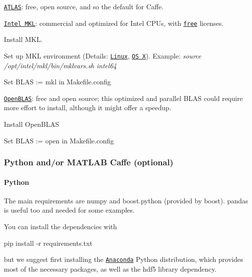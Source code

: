 \begin{DoxyItemize}
\item \href{http://math-atlas.sourceforge.net/}{\tt A\+T\+L\+AS}\+: free, open source, and so the default for Caffe.
\item \href{http://software.intel.com/en-us/intel-mkl}{\tt Intel M\+KL}\+: commercial and optimized for Intel C\+P\+Us, with \href{https://registrationcenter.intel.com/en/forms/?productid=2558}{\tt free} licenses.
\begin{DoxyEnumerate}
\item Install M\+KL.
\item Set up M\+KL environment (Details\+: \href{https://software.intel.com/en-us/node/528499}{\tt Linux}, \href{https://software.intel.com/en-us/node/528659}{\tt OS X}). Example\+: {\itshape source /opt/intel/mkl/bin/mklvars.sh intel64}
\item Set {\ttfamily B\+L\+AS \+:= mkl} in {\ttfamily Makefile.\+config}
\end{DoxyEnumerate}
\item \href{http://www.openblas.net/}{\tt Open\+B\+L\+AS}\+: free and open source; this optimized and parallel B\+L\+AS could require more effort to install, although it might offer a speedup.
\begin{DoxyEnumerate}
\item Install Open\+B\+L\+AS
\item Set {\ttfamily B\+L\+AS \+:= open} in {\ttfamily Makefile.\+config}
\end{DoxyEnumerate}
\end{DoxyItemize}

\subsubsection*{Python and/or M\+A\+T\+L\+AB Caffe (optional)}

\paragraph*{Python}

The main requirements are {\ttfamily numpy} and {\ttfamily boost.\+python} (provided by boost). {\ttfamily pandas} is useful too and needed for some examples.

You can install the dependencies with \begin{DoxyVerb}pip install -r requirements.txt
\end{DoxyVerb}


but we suggest first installing the \href{https://store.continuum.io/cshop/anaconda/}{\tt Anaconda} Python distribution, which provides most of the necessary packages, as well as the {\ttfamily hdf5} library dependency.

